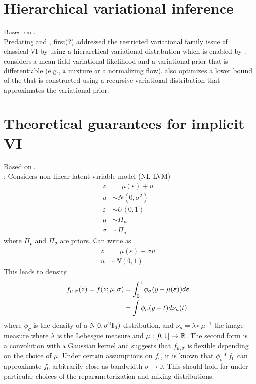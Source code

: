 \documentclass[10pt]{article}
\begin{document}
\section{Hierarchical variational inference}

Based on \citet{Ranganath:2016}.
\\

Predating \sivi and \uivi, \hvm first(?) addressed the restricted variational family issue of classical VI by using a hierarchical variational distribution which is enabled by \bbvi. \hvm considers a mean-field variational likelihood and a variational prior that is differentiable (e.g., a mixture or a normalizing flow). \hvm also optimizes a lower bound of the \elbo that is constructed using a recursive variational distribution that approximates the variational prior.


\newpage


\section{Theoretical guarantees for implicit VI}

Based on \citet{Plummer:2021}.
\\

\todo: Considers non-linear latent variable model (NL-LVM)
\begin{align*}
z &= \mu(\varepsilon) + u \\
u &\sim N(0,\sigma^2) \\
\varepsilon &\sim U(0,1) \\
\mu &\sim \Pi_\mu \\
\sigma &\sim \Pi_\sigma
\end{align*}
where $\Pi_\mu$ and $\Pi_\sigma$ are priors. Can write as
\begin{align*}
z &= \mu(\varepsilon) + \sigma u \\
u &\sim N(0,1)
\end{align*}
This leads to density
\begin{align*}
f_{\mu,\sigma}(z) = f(z;\mu,\sigma) &= \int_0^1\phi_\sigma(y-\mu(\bm{\varepsilon}))d\bm{\varepsilon} \\
&= \int \phi_\sigma(y-t)d\nu_\mu(t)
\end{align*}
where $\phi_\sigma$ is the density of a N$(0,\sigma^2\mathbf{I}_d)$ distribution, and $\nu_\mu=\lambda\circ\mu^{-1}$ the image measure where $\lambda$ is the Lebesgue measure and $\mu:[0,1]\rightarrow\mathbb{R}$. The second form is a convolution with a Gaussian kernel and suggests that $f_{\mu,\sigma}$ is flexible depending on the choice of $\mu$. Under certain assumptions on $f_0$, it is known that $\phi_\sigma*f_0$ can approximate $f_0$ arbitrarily close as bandwidth $\sigma\rightarrow 0$. This should hold for \uivi under particular choices of the reparameterization and mixing distributions.
\\
\end{document}
